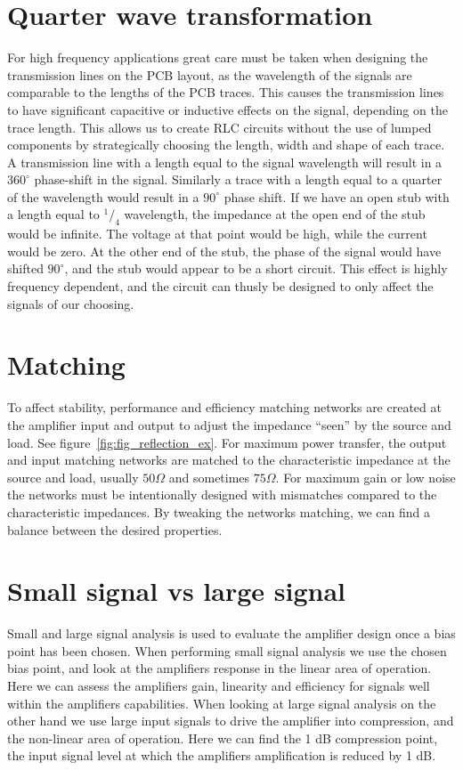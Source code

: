 \section{Quarter wave transformation}
For high frequency applications great care must be taken when designing the transmission lines on the PCB layout, as the wavelength of the signals are comparable to the lengths of the PCB traces. This causes the transmission lines to have significant capacitive or inductive effects on the signal, depending on the trace length. This allows us to create RLC circuits without the use of lumped components by strategically choosing the length, width and shape of each trace. A transmission line with a length equal to the signal wavelength will result in a $360^\circ$ phase-shift in the signal. Similarly a trace with a length equal to a quarter of the wavelength would result in a $90^\circ$ phase shift. If we have an open stub with a length equal to $^1/_4$ wavelength, the impedance at the open end of the stub would be infinite. The voltage at that point would be high, while the current would be zero. At the other end of the stub, the phase of the signal would have shifted  $90^\circ$, and the stub would appear to be a short circuit. This effect is highly frequency dependent, and the circuit can thusly be designed to only affect the signals of our choosing.
\section{Matching}
To affect stability, performance and efficiency matching networks are created at the amplifier input and output to adjust the impedance “seen” by the source and load. See figure~\ref{fig:fig_reflection_ex}. For maximum power transfer, the output and input matching networks are matched to the characteristic impedance at the source and load, usually $50\Omega$ and sometimes $75\Omega$. For maximum gain or low noise the networks must be intentionally designed with mismatches compared to the characteristic impedances. By tweaking the networks matching, we can find a balance between the desired properties.

\section{Small signal vs large signal}
Small and large signal analysis is used to evaluate the amplifier design once a bias point has been chosen. When performing small signal analysis we use the chosen bias point, and look at the amplifiers response in the linear area of operation. Here we can assess the amplifiers gain, linearity and efficiency for signals well within the amplifiers capabilities.
When looking at large signal analysis on the other hand we use large input signals to drive the amplifier into compression, and the non-linear area of operation. Here we can find the 1 dB compression point, the input signal level at which the amplifiers amplification is reduced by 1 dB.

